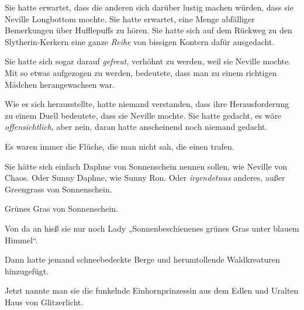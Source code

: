 Sie hatte erwartet, dass die anderen sich darüber lustig machen würden, dass sie Neville Longbottom mochte. Sie hatte erwartet, eine Menge abfälliger Bemerkungen über Hufflepuffs zu hören. Sie hatte sich auf dem Rückweg zu den Slytherin-Kerkern eine ganze \emph{Reihe} von bissigen Kontern dafür ausgedacht.

Sie hatte sich sogar darauf \emph{gefreut}, verhöhnt zu werden, weil sie Neville mochte. Mit so etwas aufgezogen zu werden, bedeutete, dass man zu einem richtigen Mädchen herangewachsen war.

Wie es sich herausstellte, hatte niemand verstanden, dass ihre Herausforderung zu einem Duell bedeutete, dass sie Neville mochte. Sie hatte gedacht, es wäre \emph{offensichtlich}, aber nein, daran hatte anscheinend noch niemand gedacht.

Es waren immer die Flüche, die man nicht sah, die einen trafen.

Sie hätte sich einfach Daphne von Sonnenschein nennen sollen, wie Neville von Chaos. Oder Sunny Daphne, wie Sunny Ron. Oder \emph{irgendetwas} anderes, außer Greengrass von Sonnenschein.

Grünes Gras von Sonnenschein.

Von da an hieß sie nur noch Lady „Sonnenbeschienenes grünes Gras unter blauem Himmel“.

Dann hatte jemand schneebedeckte Berge und herumtollende Waldkreaturen hinzugefügt.

Jetzt nannte man sie die funkelnde Einhornprinzessin aus dem Edlen und Uralten Haus von Glitzerlicht.

